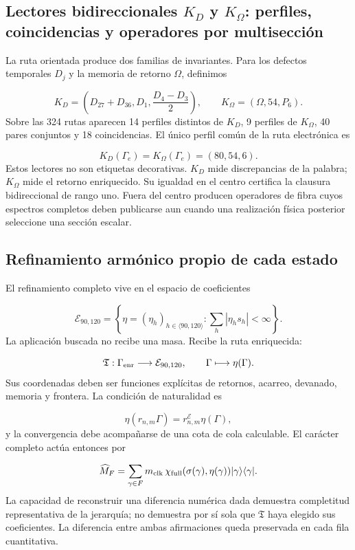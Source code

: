 \subsection{Lectores bidireccionales \(K_D\) y \(K_\Omega\): perfiles, coincidencias y operadores por multisección}
La ruta orientada produce dos familias de invariantes. Para los defectos temporales \(D_j\) y la memoria de retorno \(\Omega\), definimos

\[
K_D=\left(D_{27}+D_{36},D_1,\frac{D_4-D_3}{2}\right),
\qquad
K_\Omega=(\Omega,54,P_6).
\]
Sobre las 324 rutas aparecen 14 perfiles distintos de \(K_D\), 9 perfiles de \(K_\Omega\), 40 pares conjuntos y 18 coincidencias. El único perfil común de la ruta electrónica es

\[
K_D(\Gamma_e)=K_\Omega(\Gamma_e)=(80,54,6).
\]
Estos lectores no son etiquetas decorativas. \(K_D\) mide discrepancias de la palabra; \(K_\Omega\) mide el retorno enriquecido. Su igualdad en el centro certifica la clausura bidireccional de rango uno. Fuera del centro producen operadores de fibra cuyos espectros completos deben publicarse aun cuando una realización física posterior seleccione una sección escalar.

\subsection{Refinamiento armónico propio de cada estado}
El refinamiento completo vive en el espacio de coeficientes

\[
\mathcal E_{90,120}
=\left\{\eta=(\eta_h)_{h\in\langle90,120\rangle}:
\sum_h|\eta_hs_h|<\infty\right\}.
\]
La aplicación buscada no recibe una masa. Recibe la ruta enriquecida:

\[
\mathfrak T:\Gamma_{\rm enr}\longrightarrow\mathcal E_{90,120},
\qquad
\Gamma\longmapsto\eta(\Gamma).
\]
Sus coordenadas deben ser funciones explícitas de retornos, acarreo, devanado, memoria y frontera. La condición de naturalidad es

\[
\eta(r_{n,m}\Gamma)=r^{\mathcal E}_{n,m}\eta(\Gamma),
\]
y la convergencia debe acompañarse de una cota de cola calculable. El carácter completo actúa entonces por

\[
\widehat M_F
=\sum_{\gamma\in F}
m_{\rm clk}\,
\chi_{\rm full}(\sigma(\gamma),\eta(\gamma))
|\gamma\rangle\langle\gamma|.
\]
La capacidad de reconstruir una diferencia numérica dada demuestra completitud representativa de la jerarquía; no demuestra por sí sola que \(\mathfrak T\) haya elegido sus coeficientes. La diferencia entre ambas afirmaciones queda preservada en cada fila cuantitativa.

